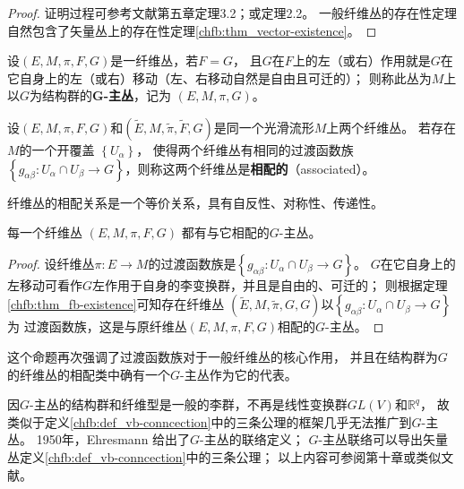 \begin{proof}
    证明过程可参考文献\parencite{Husemoller-1994}第五章定理3.2；或\parencite[\S 10.2]{chen-li-2004v2}定理2.2。
    一般纤维丛的存在性定理自然包含了矢量丛上的存在性定理\ref{chfb:thm_vector-existence}。
\end{proof}



\begin{definition}
    设$(E, M, \pi, F, G)$是一纤维丛，若$F=G$，
    且$G$在$F$上的左（或右）作用就是$G$在它自身上的左（或右）移动（左、右移动自然是自由且可迁的）；
    则称此丛为$M$上以$G$为结构群的\textbf{\bfseries G-主丛}，记为 $(E, M, \pi, G)$。
\end{definition} 

\begin{definition}\label{chfb:def_associated}
    设$(E, M, \pi, F, G)$和$(\widetilde{E}, M, \tilde{\pi}, \widetilde{F}, G)$是同一个光滑流形$M$上两个纤维丛。
    若存在$M$的一个开覆盖 $\left\{U_\alpha\right\}$，
    使得两个纤维丛有相同的过渡函数族$\left\{g_{\alpha \beta}:
    U_\alpha \cap U_\beta \rightarrow G\right\}$，则称这两个纤维丛是\textbf{相配的}（associated）。
\end{definition} 

纤维丛的相配关系是一个等价关系，具有自反性、对称性、传递性。

\begin{proposition}
    每一个纤维丛 $(E, M, \pi, F, G)$ 都有与它相配的$G$-主丛。
\end{proposition} 
\begin{proof}
    设纤维丛$\pi: E \rightarrow M$的过渡函数族是$\left\{g_{\alpha \beta}: U_\alpha \cap U_\beta \rightarrow G\right\}$。
    $G$在它自身上的左移动可看作$G$左作用于自身的李变换群，并且是自由的、可迁的；
    则根据定理\ref{chfb:thm_fb-existence}可知存在纤维丛
    $(\widetilde{E}, M, \tilde{\pi},G, G)$以$\left\{g_{\alpha \beta}: U_\alpha \cap U_\beta \rightarrow G\right\}$为
    过渡函数族，这是与原纤维丛$(E, M, \pi, F, G)$相配的$G$-主丛。
\end{proof}

这个命题再次强调了过渡函数族对于一般纤维丛的核心作用，
并且在结构群为$G$的纤维丛的相配类中确有一个$G$-主丛作为它的代表。


因$G$-主丛的结构群和纤维型是一般的李群，不再是线性变换群$GL(V)$和$\mathbb{R}^q$，
故类似于定义\ref{chfb:def_vb-conncection}中的三条公理的框架几乎无法推广到$G$-主丛。
1950年，Ehresmann 给出了$G$-主丛的联络定义；
$G$-主丛联络可以导出矢量丛定义\ref{chfb:def_vb-conncection}中的三条公理；
以上内容可参阅\parencite{chen-li-2004v2}第十章或类似文献。





